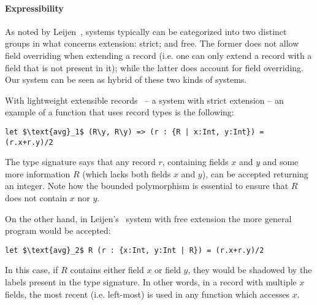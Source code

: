 \begin{comment}
\begin{lstlisting}[mathescape=true]
let $\text{addL}_3$ (A * { l : $\bot$ }) (x : A) : A & { l : $\bot$ } = $\ldots$ in $\ldots$ 
\end{lstlisting}
Unfortunately, our system does not support the $\bot$ type, so this program would not be accepted.
We will get into the reasons for this in further detail, in Section~\ref{sec:conclusion}.
\end{comment}


\paragraph{Expressibility}
As noted by Leijen~\cite{leijen2005extensible}, systems typically can be
categorized into two distinct groups in what concerns extension:
strict; and free. The former does not allow field overriding when
extending a record (i.e. one can only extend a record with a field
that is not present in it); while the latter does account for field
overriding.  Our system can be seen as hybrid of these two kinds of
systems.  

With lightweight extensible records~\cite{jones99lightweight} -- a system with strict extension -- an example of a function that uses 
record types is the following:
\begin{lstlisting}[mathescape=true]
let $\text{avg}_1$ (R\y, R\y) => (r : {R | x:Int, y:Int}) = (r.x+r.y)/2
\end{lstlisting}
The type signature says that any record $r$, containing fields $x$
and $y$ and some more information $R$ (which lacks both fields $x$ and
$y$), can be accepted returning an integer.  Note how the bounded
polymorphism is essential to ensure that $R$ does not contain $x$ nor
$y$.

On the other hand, in Leijen's~\cite{leijen2005extensible} system with free extension 
the more general program would be accepted:
\begin{lstlisting}[mathescape=true]
let $\text{avg}_2$ R (r : {x:Int, y:Int | R}) = (r.x+r.y)/2 
\end{lstlisting}
In this case, if $R$ contains either field $x$ or field $y$, they would be shadowed by the labels 
present in the type signature.
In other words, in a record with multiple $x$ fields, the most recent (i.e. left-most) is used 
in any function which accesses $x$.

